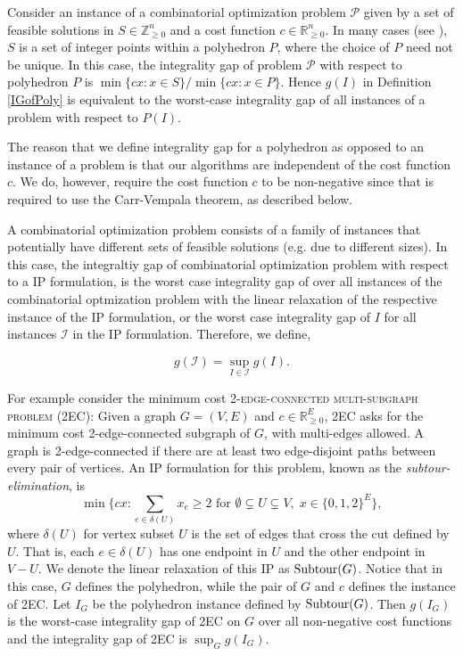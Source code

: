 Consider an instance of a combinatorial optimization problem $\mathcal{P}$ given by a set of feasible solutions in $S\in \mathbb{Z}_{\geq 0}^n$ and a cost function $c\in \mathbb{R}_{\geq 0}^n$. In many cases (see \cite{vazirani,shmoyswilliamson}), $S$ is a set of integer points within a polyhedron $P$, where the choice of $P$ need not be unique. In this case, the integrality gap of problem $\mathcal{P}$ with respect to polyhedron $P$ is $\min\{cx:x\in S\}/{\min\{cx:x\in P\}}$. Hence $g(I)$ in Definition \ref{IGofPoly} is equivalent to the worst-case integrality gap of all instances of a problem with respect to $P(I)$. 

The reason that we define integrality gap for a polyhedron as opposed to an instance of a problem is that our algorithms are independent of the cost function $c$. We do, however, require the cost function $c$ to be non-negative since that is required to use the Carr-Vempala theorem, as described below.
 
A combinatorial optimization problem consists of a family of instances that potentially have different sets of feasible solutions (e.g. due to different sizes). In this case, the integraltiy gap of combinatorial optimization problem with respect to a IP formulation, is the worst case integrality gap of over all instances of the combinatorial optmization problem with the linear relaxation of the respective instance of the IP formulation, or the worst case integrality gap of $I$ for all instances $\mathcal{I}$ in the IP formulation. Therefore, we define,
 
\begin{equation}\label{gapproblem}
g(\mathcal{I}) = \sup_{I\in\mathcal{I}}g(I).
\end{equation}

For example consider the minimum cost \textsc{2-edge-connected multi-subgraph problem (2EC)}: Given a graph $G=(V,E)$ and $c\in \mathbb{R}^E_{\geq 0}$, 2EC asks for the minimum cost 2-edge-connected subgraph of $G$, with multi-edges allowed. A graph is 2-edge-connected if there are at least two edge-disjoint paths between every pair of vertices.  An IP formulation for this problem, known as the {\em subtour-elimination}, is
 \begin{equation}\min \{cx: \sum_{e\in \delta(U)}x_e \geq 2 \mbox{ for } \emptyset \subsetneq U \subsetneq V,\; x\in \{0,1,2\}^{E}\}, 
 \label{eq:subtour}
 \end{equation}
where $\delta(U)$ for vertex subset $U$ is the set of edges that cross the cut defined by $U$.  That is, each $e \in \delta(U)$ has one endpoint in $U$ and the other endpoint in $V-U$. We denote the linear relaxation of this IP as $\operatorname{{Subtour}}(G)$. Notice that in this case, $G$ defines the polyhedron, while the pair of $G$ and $c$ defines the instance of 2EC. Let $I_G$ be the polyhedron instance defined by $\operatorname{{Subtour}}(G)$. Then $g(I_G)$ is the worst-case integrality gap of 2EC on $G$ over all non-negative cost functions and the integrality gap of 2EC is $\sup_{G} g(I_G)$. 



